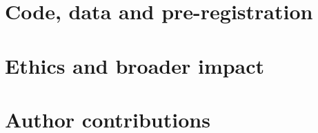 \section*{Code, data and pre-registration}

\section*{Ethics and broader impact}

\section*{Author contributions}
